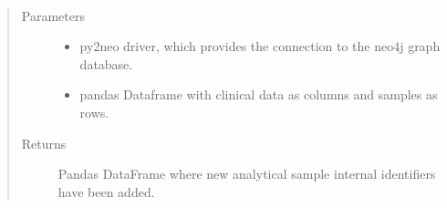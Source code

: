 \documentclass[letterpaper,10pt,english]{sphinxmanual}
\begin{document}
\begin{fulllineitems}
\label{\detokenize{_autosummary/report_manager.apps:report_manager.apps.dataUpload.create_new_ansamples}}~\begin{quote}\begin{description}
\item[{Parameters}] \leavevmode\begin{itemize}
\item {} 
 \textendash{} py2neo driver, which provides the connection to the neo4j graph database.

\item {} 
 \textendash{} pandas Dataframe with clinical data as columns and samples as rows.

\end{itemize}

\item[{Returns}] \leavevmode
Pandas DataFrame where new analytical sample internal identifiers have been added.

\end{description}\end{quote}

\end{fulllineitems}


\begin{fulllineitems}
\label{\detokenize{_autosummary/report_manager.apps:report_manager.apps.dataUpload.create_experiment_internal_identifiers}}
\end{fulllineitems}

\end{document}
